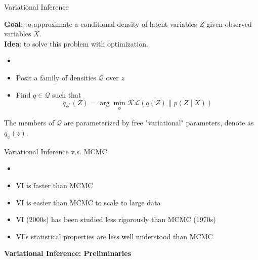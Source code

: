 \documentclass{beamer}
\begin{document}
\begin{frame}{Variational Inference}

\textbf{Goal}: to approximate a conditional density of latent variables $Z$
given observed variables $X$.\\

{\bf Idea}: to solve this problem with \textcolor{DeepPink3}{optimization}.

\begin{itemize}
    \item[]
    \item Posit a family of densities $\mathcal{Q}$ over $z$
    \item Find $q\in\mathcal{Q}$ such that $$q_{\phi^\ast}(Z)=\arg\min_{\phi}\mathcal{KL}(q(Z)\parallel p(Z\mid X))$$
\end{itemize}
The members of $\mathcal{Q}$ are  parameterized by free "variational" parameters, denote as $q_{\phi}(z).$
\end{frame}
\begin{frame}{Variational Inference v.s. MCMC}
\begin{itemize}
    \item[]
    \item VI is faster than MCMC
    \item VI is easier than MCMC to scale to large data
    \item VI (2000s) has been studied less rigorously than MCMC (1970s)
    \item VI's statistical properties are less well understood than MCMC
\end{itemize}
\end{frame}
{%
\begin{frame}
\begin{center}
{\bf\LARGE Variational Inference: Preliminaries}
\end{center}
\end{frame}
}%
\end{document}
